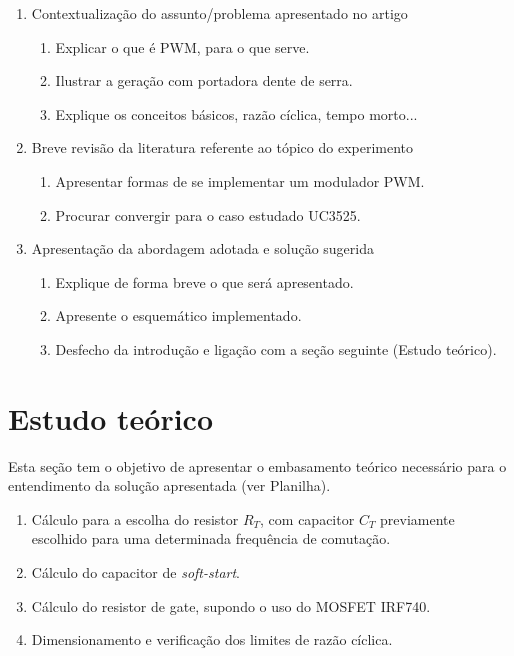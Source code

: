 \begin{enumerate}
\item Contextualização do assunto/problema apresentado no artigo
	\begin{enumerate}
		\item Explicar o que é PWM, para o que serve.
		\item Ilustrar a geração com portadora dente de serra.
		\item  Explique os conceitos básicos, razão cíclica, tempo morto...		
	\end{enumerate}									
\item Breve revisão da literatura referente ao tópico do experimento
	\begin{enumerate}
		\item Apresentar formas de se implementar um modulador PWM.
		\item Procurar convergir para o caso estudado UC3525.	
	\end{enumerate}	
\item Apresentação da abordagem adotada e solução sugerida
	\begin{enumerate}
		\item Explique de forma breve o que será apresentado.
		\item Apresente o esquemático implementado.
		\item  Desfecho da introdução e ligação com a seção seguinte (Estudo teórico).
	\end{enumerate}	
	\end{enumerate}	





\section{Estudo teórico}

Esta seção tem o objetivo de apresentar o embasamento teórico necessário para o entendimento da solução apresentada (ver Planilha). 
\begin{enumerate}	
	\item Cálculo para a escolha do resistor $R_T$, com capacitor $C_T$ previamente escolhido para uma determinada frequência de comutação. 								
	\item  Cálculo do capacitor de \textit{soft-start}.	
	\item Cálculo do resistor de gate, supondo o uso do MOSFET IRF740.	
	\item  Dimensionamento e verificação dos limites de razão cíclica.	
\end{enumerate}


